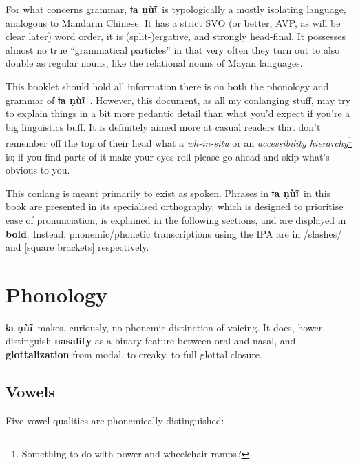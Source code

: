 \documentclass[11pt]{book}
\newcommand{\qcn}[1]{\textbf{#1}}
\newcommand{\langname}{\qcn{ǂa ṇùĩ}~}
\begin{document}
For what concerns grammar, \langname is typologically a mostly isolating language, analogous to Mandarin Chinese. It has a strict SVO (or better, AVP, as will be clear later) word order, it is (split-)ergative, and strongly head-final. It possesses almost no true ``grammatical particles'' in that very often they turn out to also double as regular nouns, like the relational nouns of Mayan languages.

This booklet should hold all information there is on both the phonology and grammar of \langname. However, this document, as all my conlanging stuff, may try to explain things in a bit more pedantic detail than what you'd expect if you're a big linguistics buff. It is definitely aimed more at casual readers that don't remember off the top of their head what a \emph{wh-in-situ} or an \emph{accessibility hierarchy}\footnote{Something to do with power and wheelchair ramps?} is; if you find parts of it make your eyes roll please go ahead and skip what's obvious to you.

This conlang is meant primarily to exist as spoken. Phrases in \langname in this book are presented in its specialised orthography, which is designed to prioritise ease of pronunciation, is explained in the following sections, and are displayed in \qcn{bold}. Instead, phonemic/phonetic transcriptions using the IPA are in /slashes/ and [square brackets] respectively.


\tableofcontents

\chapter{Phonology}

\langname makes, curiously, no phonemic distinction of voicing. It does, hower, distinguish \textbf{nasality} as a binary feature between oral and nasal, and \textbf{glottalization} from modal, to creaky, to full glottal closure. 

\section{Vowels}

Five vowel qualities are phonemically distinguished:

\begin{center}
    \begin{vowel}
        \putcvowel{\qcn{i}}{1}
        \putcvowel{\qcn{e}}{2}
        \putcvowel{\qcn{a}}{4}
        \putcvowel{\qcn{o} /ɔ/}{6}
        \putcvowel{\qcn{u}}{8}
    \end{vowel}
\end{center}
\end{document}
